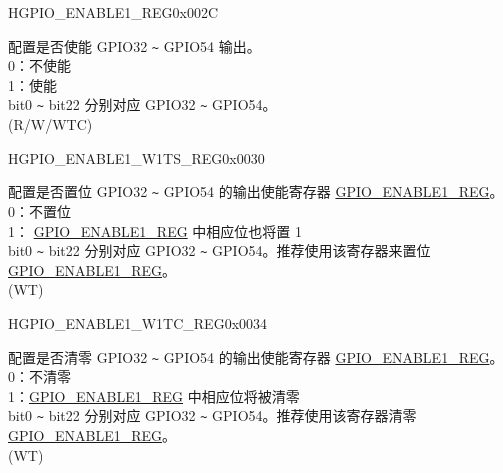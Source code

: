 \begin{register}{H}{GPIO\_ENABLE1\_REG}{0x002C}\label{regdesc:GPIOENABLE1REG}
%
%
\regnewline%
\begin{regdesc}\begin{reglist}
\label{fielddesc:GPIOENABLE1DATA}\item [GPIO\_ENABLE1\_DATA] 配置是否使能 GPIO32 \verb+~+ GPIO54 输出。\\
0：不使能\\
1：使能\\
bit0 \verb+~+ bit22 分别对应 GPIO32 \verb+~+ GPIO54。 \\
(R/W/WTC)
\end{reglist}\end{regdesc}
\end{register}


\begin{register}{H}{GPIO\_ENABLE1\_W1TS\_REG}{0x0030}\label{regdesc:GPIOENABLE1W1TSREG}
%
%
\regnewline%
\begin{regdesc}\begin{reglist}
\label{fielddesc:GPIOENABLE1W1TS}\item [GPIO\_ENABLE1\_W1TS] 配置是否置位 GPIO32 \verb+~+ GPIO54 的输出使能寄存器 \hyperref[regdesc:GPIOENABLE1REG]{GPIO\_ENABLE1\_REG}。\\
0：不置位\\
1： \hyperref[regdesc:GPIOENABLE1REG]{GPIO\_ENABLE1\_REG} 中相应位也将置 1 \\
bit0 \verb+~+ bit22 分别对应 GPIO32 \verb+~+ GPIO54。推荐使用该寄存器来置位  \hyperref[regdesc:GPIOENABLE1REG]{GPIO\_ENABLE1\_REG}。\\
(WT)
\end{reglist}\end{regdesc}
\end{register}


\begin{register}{H}{GPIO\_ENABLE1\_W1TC\_REG}{0x0034}\label{regdesc:GPIOENABLE1W1TCREG}
%
%
\regnewline%
\begin{regdesc}\begin{reglist}
\label{fielddesc:GPIOENABLE1W1TC}\item [GPIO\_ENABLE1\_W1TC] 配置是否清零 GPIO32 \verb+~+ GPIO54 的输出使能寄存器  \hyperref[regdesc:GPIOENABLE1REG]{GPIO\_ENABLE1\_REG}。\\
0：不清零 \\
 1：\hyperref[regdesc:GPIOENABLE1REG]{GPIO\_ENABLE1\_REG} 中相应位将被清零 \\
bit0 \verb+~+ bit22 分别对应 GPIO32 \verb+~+ GPIO54。推荐使用该寄存器清零  \hyperref[regdesc:GPIOENABLE1REG]{GPIO\_ENABLE1\_REG}。\\
(WT)
\end{reglist}\end{regdesc}
\end{register}


